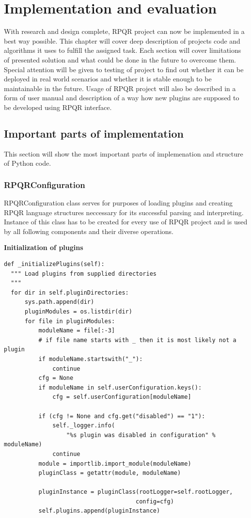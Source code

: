 \chapter{Implementation and evaluation}
With research and design complete, RPQR project can now be implemented in a best way possible.
This chapter will cover deep description of projects code and algorithms it uses to fulfill the
assigned task. Each section will cover limitations of presented solution and what could be done
in the future to overcome them. Special attention will be given to testing of project to find out
whether it can be deployed in real world scenarios and whether it is stable enough to be maintainable
in the future. Usage of RPQR project will also be described in a form of user manual and description
of a way how new plugins are supposed to be developed using RPQR interface.

\section{Important parts of implementation}
This section will show the most important parts of implemenation and structure of Python code.

\subsection*{RPQRConfiguration}
RPQRConfiguration class serves for purposes of loading plugins and creating RPQR language structures
neccessary for its successful parsing and interpreting. Instance of this class has to be created for
every use of RPQR project and is used by all following components and their diverse operations.

\newpage

\textbf{Initialization of plugins}

\begin{lstlisting}
def _initializePlugins(self):
  """ Load plugins from supplied directories
  """
  for dir in self.pluginDirectories:
      sys.path.append(dir)
      pluginModules = os.listdir(dir)
      for file in pluginModules:
          moduleName = file[:-3]
          # if file name starts with _ then it is most likely not a plugin
          if moduleName.startswith("_"):
              continue
          cfg = None
          if moduleName in self.userConfiguration.keys():
              cfg = self.userConfiguration[moduleName]

          if (cfg != None and cfg.get("disabled") == "1"):
              self._logger.info(
                  "%s plugin was disabled in configuration" % moduleName)
              continue
          module = importlib.import_module(moduleName)
          pluginClass = getattr(module, moduleName)

          pluginInstance = pluginClass(rootLogger=self.rootLogger,
                                      config=cfg)
          self.plugins.append(pluginInstance)
\end{lstlisting}

